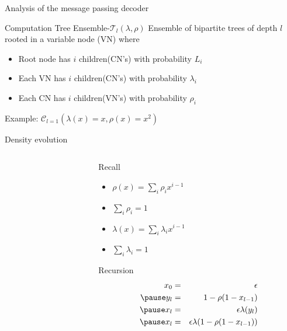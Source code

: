 \begin{frame}{Analysis of the message passing decoder}

\begin{block}{Computation Tree Ensemble-$\mathcal{T}_{l}(\lambda,\rho)$}
Ensemble of bipartite trees of depth $l$ rooted in a variable node (VN) where
\begin{itemize}
\item Root node has $i$ children(CN's) with probability $L_i$
\item Each VN has $i$ children(CN's) with probability $\lambda_i$
\item Each CN has $i$ children(VN's) with probability $\rho_i$
\end{itemize}
\end{block}

\begin{block}{Example: $\mathcal{C}_{l=1}(\lambda(x)=x,\rho(x)=x^2)$}
\begin{center}
\scalebox{0.6}{}
\end{center}
\end{block}

\end{frame}
\begin{frame}{Density evolution}
\begin{columns}
\begin{column}{0.65\textwidth}
\begin{centering}
\scalebox{0.73}{}
\end{centering}
\end{column}

\begin{column}{0.35\textwidth}
\begin{block}{Recall}
\begin{itemize}
  \item $\rho(x) = \sum_{i} \rho_i x^{i-1}$
  \item $\sum_i \rho_i = 1$
  \item $\lambda(x) = \sum_{i} \lambda_i x^{i-1}$
  \item $\sum_i \lambda_i = 1$
\end{itemize}
\end{block}
\begin{block}{Recursion}
\begin{eqnarray*}
  x_0 &=& \epsilon \\
\pause
  y_l &=& 1-\rho(1-x_{l-1}) \\
\pause
  x_l &=& \epsilon \lambda(y_l)\\
\pause
  x_l &=& \epsilon \lambda(1-\rho(1-x_{l-1}))
\end{eqnarray*}
\end{block}
\end{column}
\end{columns}
\end{frame}
